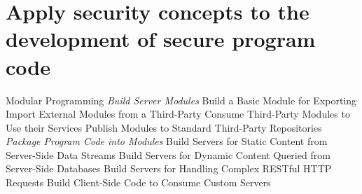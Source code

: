 \section {Apply security concepts to the development of secure program code }
\begin{frame}{Modular Programming }
\newline       \emph{Build Server Modules}
	Build a Basic Module for Exporting
	Import External Modules from a Third-Party
	Consume Third-Party Modules to Use their Services
	Publish Modules to Standard Third-Party Repositories
\newline        \emph{Package Program Code into Modules}
	Build Servers for Static Content from Server-Side Data Streams
	Build Servers for Dynamic Content Queried from Server-Side Databases
	Build Servers for Handling Complex RESTful HTTP Requests
	Build Client-Side Code to Consume Custom Servers
\end{frame}		